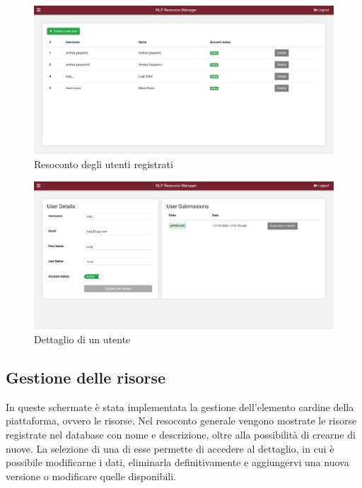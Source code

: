 \begin{figure}[H]
	\centering
	\includegraphics[width=\textwidth]{assets/ui/users-list.png}
	\caption{Resoconto degli utenti registrati}
	\label{fig:users-list}
\end{figure}

\begin{figure}[H]
	\centering
	\includegraphics[width=\textwidth]{assets/ui/user-details.png}
	\caption{Dettaglio di un utente}
	\label{fig:user-details}
\end{figure}


\subsection{Gestione delle risorse}
In queste schermate è stata implementata la gestione dell'elemento cardine della
piattaforma, ovvero le risorse. Nel resoconto generale vengono mostrate le risorse
registrate nel database con nome e descrizione, oltre alla possibilità di crearne
di nuove. La selezione di una di esse permette di accedere al dettaglio, in cui
è possibile modificarne i dati, eliminarla definitivamente e aggiungervi una nuova
versione o modificare quelle disponibili.

